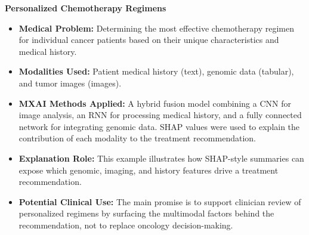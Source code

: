 \documentclass[pdflatex,sn-mathphys-num]{sn-jnl}%
\theoremstyle{thmstyleone}%
\theoremstyle{thmstyletwo}%
\theoremstyle{thmstylethree}%
\begin{document}
\begin{itemize}
     \textbf{Personalized Chemotherapy Regimens}
    \begin{itemize}
        \item \textbf{Medical Problem:} Determining the most effective chemotherapy regimen for individual cancer patients based on their unique characteristics and medical history.
        \item \textbf{Modalities Used:} Patient medical history (text), genomic data (tabular), and tumor images (images).
        \item \textbf{MXAI Methods Applied:} A hybrid fusion model combining a CNN for image analysis, an RNN for processing medical history, and a fully connected network for integrating genomic data. SHAP values were used to explain the contribution of each modality to the treatment recommendation.
        \item \textbf{Explanation Role:} This example illustrates how SHAP-style summaries can expose which genomic, imaging, and history features drive a treatment recommendation.
        \item \textbf{Potential Clinical Use:} The main promise is to support clinician review of personalized regimens by surfacing the multimodal factors behind the recommendation, not to replace oncology decision-making.
    \end{itemize}
    

\end{itemize}
\end{document}
